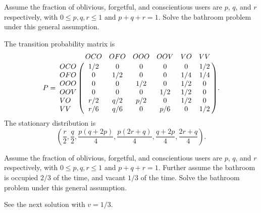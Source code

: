 \documentclass[12pt]{article}
\begin{document}
\begin{enumerate}
\begin{exercise}
    Assume the fraction of oblivious, forgetful, and conscientious users
    are \( p \), \( q \), and \( r \) respectively, with \( 0 \le p,q,r
    \le 1 \) and \( p + q + r = 1 \).  Solve the bathroom problem under
    this general assumption.
\end{exercise}
\begin{solution}
    The transition probability matrix is
    \[
        P= \bordermatrix{ & OCO & OFO & OOO & OOV & VO & VV \cr
        OCO & 1/2 & 0 & 0 & 0 & 0 & 1/2 \cr
        OFO & 0 & 1/2 & 0 & 0 & 1/4 & 1/4 \cr
        OOO & 0 & 0 & 1/2 & 0 & 1/2 & 0 \cr
        OOV & 0 & 0 & 0 & 1/2 & 1/2 & 0 \cr
        VO & r/2 & q/2 & p/2 & 0 & 1/2 & 0 \cr
        VV & r/6 & q/6 & 0 & p/6 & 0 & 1/2 \cr
        }.
    \] The stationary distribution is
    \[
        \left( \frac{r}{2}, \frac{q}{2}, \frac{p(q + 2p)}{4}, \frac{p(2r
        + q)}{4}, \frac{q + 2p}{4}, \frac{2r + q}{4} \right).
    \]
\end{solution}

\begin{exercise}
    Assume the fraction of oblivious, forgetful, and conscientious users
    are \( p \), \( q \), and \( r \) respectively, with \( 0 \le p,q,r
    \le 1 \) and \( p + q + r = 1 \).  Further assume the bathroom is
    occupied \( 2/3 \) of the time, and vacant \( 1/3 \) of the time.
    Solve the bathroom problem under this general assumption.

\end{exercise}
\begin{solution}
    See the next solution with \( v = 1/3 \).
\end{solution}


\end{enumerate}
\end{document}

